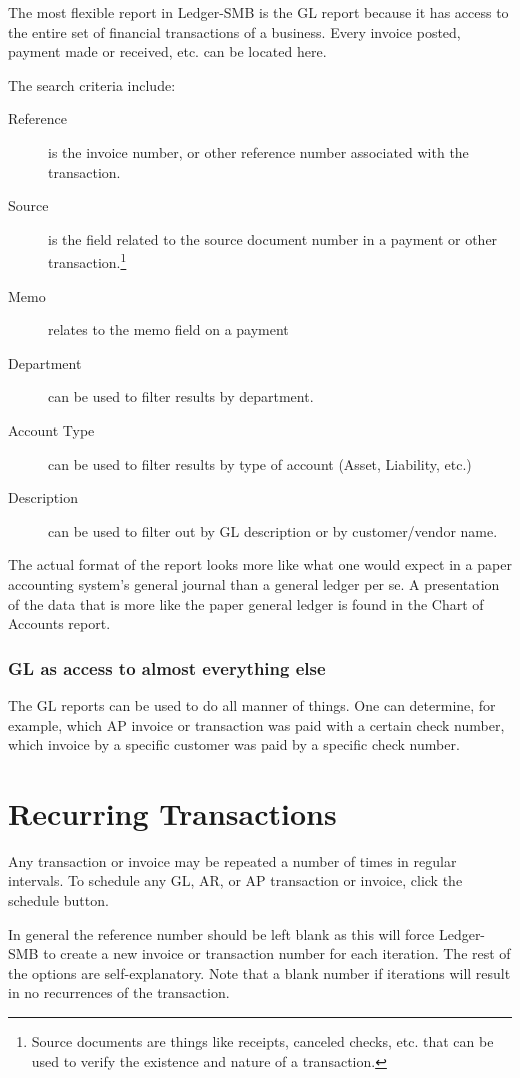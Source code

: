 \documentclass{article}
\begin{document}
The most flexible report in Ledger-SMB is the GL report because it has access to
the entire set of financial transactions of a business.  Every invoice posted,
payment made or received, etc. can be located here.

The search criteria include:

\begin{description}
\item[Reference] is the invoice number, or other reference number associated
with the transaction.
\item[Source] is the field related to the source document number in a payment or
other transaction.\footnote{Source documents are things like receipts, canceled
checks, etc. that can be used to verify the existence and nature of a
transaction.}
\item[Memo] relates to the memo field on a payment
\item[Department] can be used to filter results by department.
\item[Account Type] can be used to filter results by type of account (Asset,
Liability, etc.)
\item[Description] can be used to filter out by GL description or by
customer/vendor name.
\end{description}

The actual format of the report looks more like what one would expect in a paper
accounting system's general journal than a general ledger per se.  A
presentation of the data that is more like the paper general ledger is found in
the Chart of Accounts report.

\subsubsection{GL as access to almost everything else}

The GL reports can be used to do all manner of things.  One can determine, for
example, which AP invoice or transaction was paid with a certain check number,
which invoice by a specific customer was paid by a specific check number.

\section{Recurring Transactions}
Any transaction or invoice may be repeated a number of times in regular
intervals.  To schedule any GL, AR, or AP transaction or invoice, click the
schedule button.

In general the reference number should be left blank as this will force
Ledger-SMB to create a new invoice or transaction number for each iteration.
The rest of the options are self-explanatory.  Note that a blank number if
iterations will result in no recurrences of the transaction.
\end{document}

